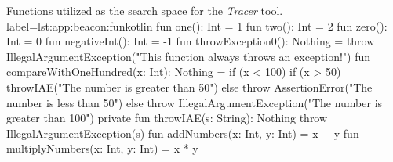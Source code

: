 \begin{code}{%
    Functions utilized as the search space for the \textit{Tracer} tool.
}{label=lst:app:beacon:fun}{kotlin}
    fun one(): Int = 1
    fun two(): Int = 2
    fun zero(): Int = 0
    fun negativeInt(): Int = -1
    fun throwException0(): Nothing = throw IllegalArgumentException("This function always throws an exception!")
    fun compareWithOneHundred(x: Int): Nothing = if (x < 100) {
        if (x > 50) throwIAE("The number is greater than 50")
        else throw AssertionError("The number is less than 50")
    } else {
        throw IllegalArgumentException("The number is greater than 100")
    }
    private fun throwIAE(s: String): Nothing {
        throw IllegalArgumentException(s)
    }
    fun addNumbers(x: Int, y: Int) = x + y
    fun multiplyNumbers(x: Int, y: Int) = x * y
\end{code}

